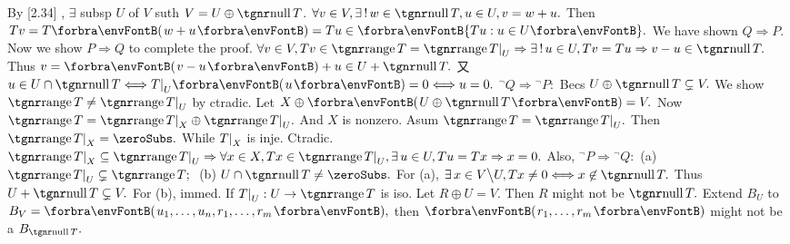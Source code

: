 By [2.34] , $\exists$ subsp $U$ of $V$ suth $V=U\oplus\null T$.\parSol{}
$\forall v\in V,\exists\,!\,w\in\null T,u\in U, v=w+u.$ Then $Tv=T\Par{w+u}=Tu\in\Bra{Tu:u\in U}.$\PfEnd\vspace{6pt}
\vspace{2pt}\parCor
We have shown $Q\Rightarrow P.$ Now we show $P\Rightarrow Q$ to complete the proof.\parCor
$\forall v\in V,Tv\in\range T=\range T\mmid_U\Rightarrow \exists\,!\,u\in U,Tv=Tu\Rightarrow v-u\in\null T.$\parCor Thus $v=\Par{v-u}+u\in U+\null T.$ 又 $u\in U\cap\null T\Longleftrightarrow T\mmid_U\Par{u}=0\Longleftrightarrow u=0.$\PfEnd\vspace{4pt}\parCor
\Or ${}^\neg Q\Rightarrow{}^\neg P:$ \;Becs $U\oplus\null T\subsetneq V.$ We show $\range T\neq\range T\mmid_U$ by ctradic.\parCor
Let $X\oplus\Par{U\oplus\null T}=V.$ Now $\range T=\range T\mmid_X\oplus\range T\mmid_U.$ And $X$ is nonzero.\parCor
Asum $\range T=\range T\mmid_U.$ Then $\range T\mmid_X=\zeroSubs.$ While $T\text{\normalsize|}_X$ is inje. Ctradic.\parCor
\Or $\range T\mmid_X\subseteq\range T\mmid_U\Rightarrow \forall x\in X,Tx\in\range T\mmid_U,\exists\,u\in U,Tu=Tx\Rightarrow x=0.$\vspace{4pt}\parCor
Also, ${}^\neg P\Rightarrow{}^\neg Q:$ \;(a) $\range T\mmid_U\subsetneq\range T;\;$ {\OR} (b) $U\cap\null T\neq\zeroSubs.$\parCor
For (a), $\exists\,x\in V\Backslash U,Tx\neq 0\Longleftrightarrow x\not\in\null T.$ Thus $U+\null T\subsetneq V.$ For (b), immed.\PfEnd\vspace{4pt}
\AComm If $T\mmid_U:U\rightarrow\range T$ is iso. Let $R\oplus U=V.$ Then $R$ might not be $\null T.$\parCom
\Or Extend $B_U$ to $B_V=\Par{u_1,\dots,u_n,r_1,\dots,r_m},$ then $\Par{r_1,\dots,r_m}$ might not be a $B_{\null T}.$\vspace{-2pt}
\SepLine



